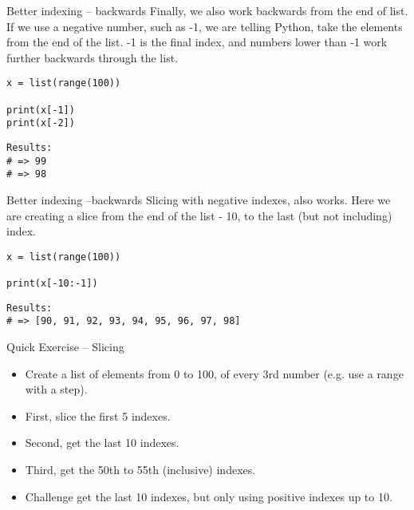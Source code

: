 \documentclass[10pt]{beamer}
\begin{document}
\begin{frame}[label={sec:orgcf41742},fragile]{Better indexing -- backwards}
 Finally, we also work backwards from the end of list. If we use a negative number,
such as -1, we are telling Python, take the elements from the end of the list. -1 is
the final index, and numbers lower than -1 work further backwards through the list.

\begin{verbatim}
x = list(range(100))

print(x[-1])
print(x[-2])
\end{verbatim}

\begin{verbatim}
Results: 
# => 99
# => 98
\end{verbatim}
\end{frame}

\begin{frame}[label={sec:orgc57fd66},fragile]{Better indexing --backwards}
 Slicing with negative indexes, also works. Here we are creating a slice from the end
of the list - 10, to the last (but not including) index.

\begin{verbatim}
x = list(range(100))

print(x[-10:-1])
\end{verbatim}

\begin{verbatim}
Results: 
# => [90, 91, 92, 93, 94, 95, 96, 97, 98]
\end{verbatim}
\end{frame}

\begin{frame}[label={sec:org8aaae30}]{Quick Exercise -- Slicing}
\begin{itemize}
\item Create a list of elements from 0 to 100, of every 3rd number (e.g. use a range
with a step).
\item First, slice the first 5 indexes.
\item Second, get the last 10 indexes.
\item Third, get the 50th to 55th (inclusive) indexes.
\item \alert{Challenge} get the last 10 indexes, but only using positive indexes up to 10.
\end{itemize}
\end{frame}
\end{document}
